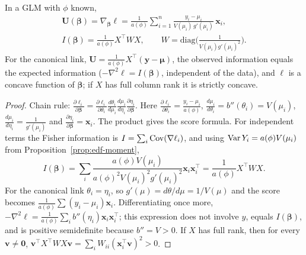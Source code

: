 \documentclass[main.tex]{subfiles}
\begin{document}
\begin{theorem}\label{thm:glm-skor}
In a GLM with $\phi$ known,
\begin{gather*}
\mathbf U(\bm\beta)=\nabla_{\bm\beta}\ell=\frac1{a(\phi)}\sum_{i=1}^n\frac{y_i-\mu_i}{V(\mu_i)\,g'(\mu_i)}\,\mathbf x_i,\\
I(\bm\beta)=\frac1{a(\phi)}X^\top WX,\qquad W=\mathrm{diag}\Big(\frac1{V(\mu_i)g'(\mu_i)^2}\Big).
\end{gather*}
For the canonical link, $\mathbf U=\frac1{a(\phi)}X^\top(\mathbf y-\bm\mu)$, the observed information equals the expected information ($-\nabla^2\ell=I(\bm\beta)$, independent of the data), and $\ell$ is a concave function of $\bm\beta$; if $X$ has full column rank it is strictly concave.
\end{theorem}
\begin{proof}
Chain rule: $\frac{\partial\ell_i}{\partial\bm\beta}=\frac{\partial\ell_i}{\partial\theta_i}\frac{d\theta_i}{d\mu_i}\frac{d\mu_i}{d\eta_i}\frac{\partial\eta_i}{\partial\bm\beta}$. Here $\frac{\partial\ell_i}{\partial\theta_i}=\frac{y_i-\mu_i}{a(\phi)}$, $\frac{d\mu_i}{d\theta_i}=b''(\theta_i)=V(\mu_i)$, $\frac{d\mu_i}{d\eta_i}=\frac1{g'(\mu_i)}$ and $\frac{\partial\eta_i}{\partial\bm\beta}=\mathbf x_i$. The product gives the score formula. For independent terms the Fisher information is $I=\sum_i\operatorname{Cov}(\nabla\ell_i)$, and using $\operatorname{Var} Y_i=a(\phi)V(\mu_i)$ from Proposition~\ref{prop:edf-moment},
\[
I(\bm\beta)=\sum_i\frac{a(\phi)V(\mu_i)}{a(\phi)^2V(\mu_i)^2g'(\mu_i)^2}\mathbf x_i\mathbf x_i^\top=\frac1{a(\phi)}X^\top WX .
\]
For the canonical link $\theta_i=\eta_i$, so $g'(\mu)=d\theta/d\mu=1/V(\mu)$ and the score becomes $\frac1{a(\phi)}\sum(y_i-\mu_i)\mathbf x_i$. Differentiating once more, $-\nabla^2\ell=\frac1{a(\phi)}\sum_ib''(\eta_i)\mathbf x_i\mathbf x_i^\top$; this expression does not involve $y$, equals $I(\bm\beta)$, and is positive semidefinite because $b''=V>0$. If $X$ has full rank, then for every $\mathbf v\ne\mathbf 0$, $\mathbf v^\top X^\top WX\mathbf v=\sum_iW_{ii}(\mathbf x_i^\top\mathbf v)^2>0$.
\end{proof}
\end{document}
